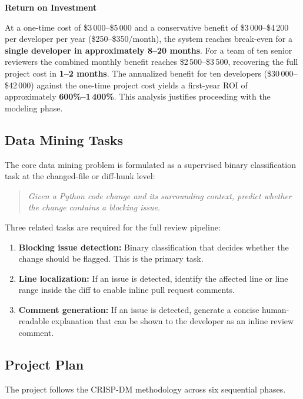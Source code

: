 \documentclass[11pt]{article}
\begin{document}
\textbf{Return on Investment}

At a one-time cost of \$3\,000--\$5\,000 and a conservative benefit of \$3\,000--\$4\,200 per developer per year (\$250--\$350/month), the system reaches break-even for a \textbf{single developer in approximately 8--20 months}. For a team of ten senior reviewers the combined monthly benefit reaches \$2\,500--\$3\,500, recovering the full project cost in \textbf{1--2 months}. The annualized benefit for ten developers (\$30\,000--\$42\,000) against the one-time project cost yields a first-year ROI of approximately \textbf{600\%--1\,400\%}. This analysis justifies proceeding with the modeling phase.

\subsection*{Data Mining Tasks}

The core data mining problem is formulated as a supervised binary classification task at the changed-file or diff-hunk level:

\begin{quote}
\textit{Given a Python code change and its surrounding context, predict whether the change contains a blocking issue.}
\end{quote}

Three related tasks are required for the full review pipeline:

\begin{enumerate}
    \item \textbf{Blocking issue detection:} Binary classification that decides whether the change should be flagged. This is the primary task.
    \item \textbf{Line localization:} If an issue is detected, identify the affected line or line range inside the diff to enable inline pull request comments.
    \item \textbf{Comment generation:} If an issue is detected, generate a concise human-readable explanation that can be shown to the developer as an inline review comment.
\end{enumerate}

\subsection*{Project Plan}

The project follows the CRISP-DM methodology across six sequential phases.
\end{document}
